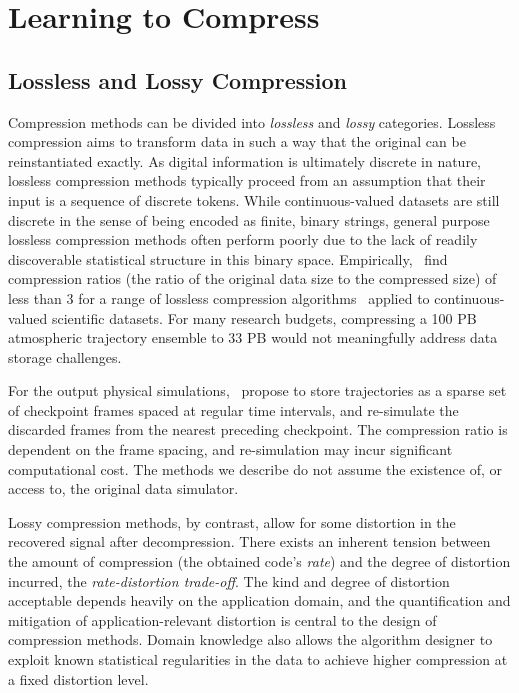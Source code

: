 \section{Learning to Compress}
\label{sx:learning2compress}

\subsection{Lossless and Lossy Compression}
\label{sx:methods:lossless-lossy}
Compression methods can be divided into \emph{lossless} and \emph{lossy} categories.
Lossless compression aims to transform data in such a way that the original can be reinstantiated exactly.
As digital information is ultimately discrete in nature, lossless compression methods typically proceed from an assumption that their input is a sequence of discrete tokens.
While continuous-valued datasets are still discrete in the sense of being encoded as finite, binary strings, general purpose lossless compression methods often perform poorly due to the lack of readily discoverable statistical structure in this binary space.
Empirically,~\citet{sdrbench_2020} find compression ratios (the ratio of the original data size to the compressed size) of less than 3 for a range of lossless compression algorithms~\citep{zstd, zfpy_2014, fpc_2009, blosc, fpzip_2006} applied to continuous-valued scientific datasets. For many research budgets, compressing a 100 PB atmospheric trajectory ensemble to 33 PB would not meaningfully address data storage challenges.

For the output physical simulations,~\cite{simfs_girolamo_2019} propose to store trajectories as a sparse set of checkpoint frames spaced at regular time intervals, and re-simulate the discarded frames from the nearest preceding checkpoint. The compression ratio is dependent on the frame spacing, and re-simulation may incur significant computational cost. The methods we describe do not assume the existence of, or access to, the original data simulator.

Lossy compression methods, by contrast, allow for some distortion in the recovered signal after decompression.
There exists an inherent tension between the amount of compression (the obtained code's \emph{rate}) and the degree of distortion incurred, the \emph{rate-distortion trade-off}.
The kind and degree of distortion acceptable depends heavily on the application domain, and the quantification and mitigation of application-relevant distortion is central to the design of compression methods.
Domain knowledge also allows the algorithm designer to exploit known statistical regularities in the data to achieve higher compression at a fixed distortion level.

